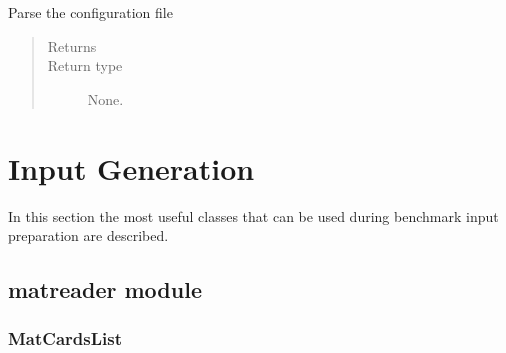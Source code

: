 \documentclass[letterpaper,10pt,english]{sphinxmanual}
\begin{document}
\begin{fulllineitems}
\begin{fulllineitems}
\end{fulllineitems}


\begin{fulllineitems}
\label{\detokenize{api/initobjects:configuration.Configuration.read_settings}}
\sphinxAtStartPar
Parse the configuration file
\begin{quote}\begin{description}
\item[{Returns}] \leavevmode
\sphinxAtStartPar


\item[{Return type}] \leavevmode
\sphinxAtStartPar
None.

\end{description}\end{quote}

\end{fulllineitems}


\end{fulllineitems}



\chapter{Input Generation}
\label{\detokenize{api/inputgeneration:input-generation}}\label{\detokenize{api/inputgeneration::doc}}
\sphinxAtStartPar
In this section the most useful classes that can be used during benchmark
input preparation are described.


\section{matreader module}
\label{\detokenize{api/inputgeneration:matreader-module}}

\subsection{MatCardsList}
\label{\detokenize{api/inputgeneration:matcardslist}}\label{\detokenize{api/inputgeneration:matcardob}}
\end{document}
